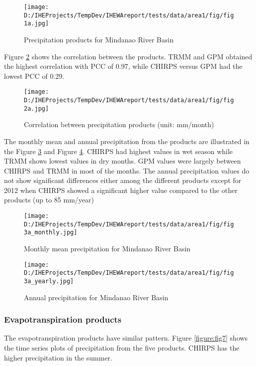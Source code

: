 \documentclass{article}%
\begin{document}
\begin{figure}[H]%
\centering%
\texttt{[image: D:/IHEProjects/TempDev/IHEWAreport/tests/data/area1/fig/fig1a.jpg]}%
\caption{Precipitation products for Mindanao River Basin}%
\label{figure:fig3}%
\end{figure}

%
Figure \ref{figure:fig4} shows the correlation between the products. TRMM and GPM obtained the highest correlation with PCC of 0.97, while CHIRPS versus GPM had the lowest PCC of 0.29.%
\linebreak%


\begin{figure}[H]%
\centering%
\texttt{[image: D:/IHEProjects/TempDev/IHEWAreport/tests/data/area1/fig/fig2a.jpg]}%
\caption{Correlation between precipitation products (unit: mm/month)}%
\label{figure:fig4}%
\end{figure}

%
The monthly mean and annual precipitation from the products are illustrated in the Figure \ref{figure:fig5} and Figure \ref{figure:fig6}. CHIRPS had highest values in wet season while TRMM shows lowest values in dry months. GPM values were largely between CHIRPS and TRMM in most of the months. The annual precipitation values do not show significant differences either among the different products except for 2012 when CHIRPS showed a significant higher value compared to the other products (up to 85 mm/year)%
\linebreak%


\begin{figure}[H]%
\centering%
\texttt{[image: D:/IHEProjects/TempDev/IHEWAreport/tests/data/area1/fig/fig3a\_monthly.jpg]}%
\caption{Monthly mean precipitation for Mindanao River Basin}%
\label{figure:fig5}%
\end{figure}

%


\begin{figure}[H]%
\centering%
\texttt{[image: D:/IHEProjects/TempDev/IHEWAreport/tests/data/area1/fig/fig3a\_yearly.jpg]}%
\caption{Annual precipitation for Mindanao River Basin}%
\label{figure:fig6}%
\end{figure}

%
\subsubsection{Evapotranspiration products}%
\label{ssubsec:Evapotranspirationproducts}%
The evapotranspiration products have similar pattern. Figure \ref{figure:fig7} shows the time series plots of precipitation from the five products. CHIRPS has the higher precipitation in the summer.%
\linebreak%
\end{document}
